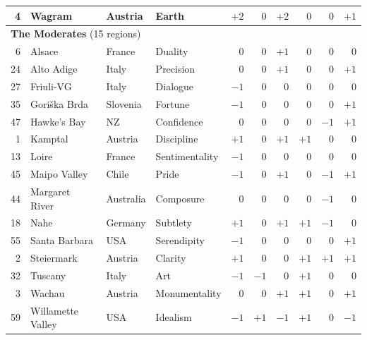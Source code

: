 \documentclass[11pt]{article}
\begin{document}
\begin{landscape}
\begin{longtable}{@{}r l l l r r r r r r@{}}
4  & Wagram               & Austria   & Earth                & $+2$ & $0$  & $+2$ & $0$  & $0$  & $+1$ \\
\midrule
\multicolumn{10}{l}{\textbf{The Moderates} (15 regions)} \\
6  & Alsace               & France    & Duality              & $0$  & $0$  & $+1$ & $0$  & $0$  & $0$  \\
24 & Alto Adige           & Italy     & Precision            & $0$  & $0$  & $+1$ & $0$  & $0$  & $+1$ \\
27 & Friuli-VG            & Italy     & Dialogue             & $-1$ & $0$  & $0$  & $0$  & $0$  & $0$  \\
35 & Gori\v{s}ka Brda     & Slovenia  & Fortune              & $-1$ & $0$  & $0$  & $0$  & $0$  & $+1$ \\
47 & Hawke's Bay          & NZ        & Confidence           & $0$  & $0$  & $0$  & $0$  & $-1$ & $+1$ \\
1  & Kamptal              & Austria   & Discipline           & $+1$ & $0$  & $+1$ & $+1$ & $0$  & $0$  \\
13 & Loire                & France    & Sentimentality       & $-1$ & $0$  & $0$  & $0$  & $0$  & $0$  \\
45 & Maipo Valley         & Chile     & Pride                & $-1$ & $0$  & $+1$ & $0$  & $-1$ & $+1$ \\
44 & Margaret River       & Australia & Composure            & $0$  & $0$  & $0$  & $0$  & $-1$ & $0$  \\
18 & Nahe                 & Germany   & Subtlety             & $+1$ & $0$  & $+1$ & $+1$ & $-1$ & $0$  \\
55 & Santa Barbara        & USA       & Serendipity          & $-1$ & $0$  & $0$  & $0$  & $0$  & $+1$ \\
2  & Steiermark           & Austria   & Clarity              & $+1$ & $0$  & $0$  & $+1$ & $+1$ & $+1$ \\
32 & Tuscany              & Italy     & Art                  & $-1$ & $-1$ & $0$  & $+1$ & $0$  & $0$  \\
3  & Wachau               & Austria   & Monumentality        & $0$  & $0$  & $+1$ & $+1$ & $0$  & $+1$ \\
59 & Willamette Valley    & USA       & Idealism             & $-1$ & $+1$ & $-1$ & $+1$ & $0$  & $-1$ \\
\bottomrule
\end{longtable}
\end{landscape}
\end{document}
